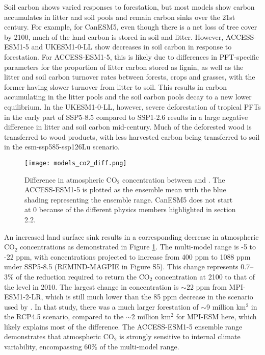 \documentclass[draft]{agujournal2019}
\begin{document}
Soil carbon shows varied responses to forestation, but most models show carbon accumulates in litter and soil pools and remain carbon sinks over the 21st century.
For example, for CanESM5, even though there is a net loss of tree cover by 2100, much of the land carbon is stored in soil and litter.
However, ACCESS-ESM1-5 and UKESM1-0-LL show decreases in soil carbon in response to forestation.
For ACCESS-ESM1-5, this is likely due to differences in PFT-specific parameters for the proportion of litter carbon stored as lignin, as well as the litter and soil carbon turnover rates between forests, crops and grasses, with the former having slower turnover from litter to soil.
This results in carbon accumulating in the litter pools and the soil carbon pools decay to a new lower equilibrium.
In the UKESM1-0-LL, however, severe deforestation of tropical PFTs in the early part of SSP5-8.5 compared to SSP1-2.6 results in a large negative difference in litter and soil carbon mid-century.
Much of the deforested wood is transferred to wood products, with less harvested carbon being transferred to soil in the esm-ssp585-ssp126Lu scenario.

\begin{figure}
    \texttt{[image: models\_co2\_diff.png]}
    \caption{Difference in atmospheric CO$_2$ concentration between  and . The ACCESS-ESM1-5 is plotted as the ensemble mean with the blue shading representing the ensemble range. CanESM5 does not start at 0 because of the different physics members highlighted in section 2.2.}
    \label{fig:models_CO2}
\end{figure}

An increased land surface sink results in a corresponding decrease in atmospheric CO$_2$ concentrations as demonstrated in Figure \ref{fig:models_CO2}.
The multi-model range is -5 to -22 ppm, with concentrations projected to increase from 400 ppm to 1088 ppm under SSP5-8.5 (REMIND-MAGPIE in Figure S5).
This change represents 0.7–3\% of the reduction required to return the CO$_2$ concentration at 2100 to that of the level in 2010.
The largest change in concentration is $\sim$22 ppm from MPI-ESM1-2-LR, which is still much lower than the 85 ppm decrease in the scenario used by .
In that study, there was a much larger forestation of $\sim$9 million km$^2$ in the RCP4.5 scenario, compared to the $\sim$2 million km$^2$ for MPI-ESM here, which likely explains most of the difference.
The ACCESS-ESM1-5 ensemble range demonstrates that atmospheric CO$_2$ is strongly sensitive to internal climate variability, encompassing 60\% of the multi-model range.
\end{document}
